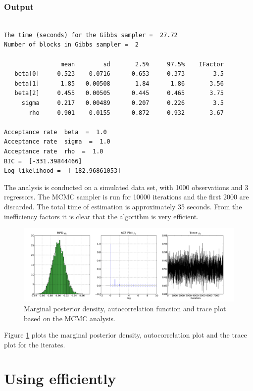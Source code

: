 \documentclass[article]{jss}
\begin{document}
\subsubsection{Output}

\begin{verbatim}

The time (seconds) for the Gibbs sampler =  27.72
Number of blocks in Gibbs sampler =  2

                mean        sd       2.5%     97.5%    IFactor
   beta[0]    -0.523    0.0716     -0.653    -0.373        3.5
   beta[1]      1.85   0.00508       1.84      1.86       3.56
   beta[2]     0.455   0.00505      0.445     0.465       3.75
     sigma     0.217   0.00489      0.207     0.226        3.5
       rho     0.901    0.0155      0.872     0.932       3.67

Acceptance rate  beta  =  1.0
Acceptance rate  sigma  =  1.0
Acceptance rate  rho  =  1.0
BIC =  [-331.39844466]
Log likelihood =  [ 182.96861053]

\end{verbatim}

The analysis is conducted on a simulated data set, with 1000 observations
and 3 regressors. The MCMC sampler is run for 10000 iterations and
the first 2000 are discarded. The total time of estimation is approximately
35 seconds. From the inefficiency factors it is clear that the algorithm
is very efficient.

%
\begin{figure}[h]
\label{Flo:AR1}
\begin{center}
  \includegraphics{rho.pdf}
\end{center}
\caption{Marginal posterior density, autocorrelation function and trace plot
based on the MCMC analysis.}

\end{figure}


Figure \ref{Flo:AR1} plots the marginal posterior density, autocorrelation
plot and the trace plot for the iterates. 


\section[Using PyMCMC  efficiently]{Using   efficiently}
\label{sec:Using-PyMCMC-efficiently}
\end{document}
